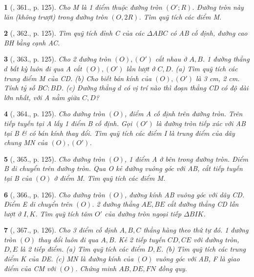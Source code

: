 \documentclass{article}
\newtheorem{baitoan}{}
\begin{document}
\begin{baitoan}[\cite{Binh_Toan_9_tap_2}, 361., p. 125]
	Cho M là 1 điểm thuộc đường tròn $(O';R)$. Đường tròn này lăn (không trượt) trong đường tròn $(O,2R)$. Tìm quỹ tích các điểm M.
\end{baitoan}

\begin{baitoan}[\cite{Binh_Toan_9_tap_2}, 362., p. 125]
	Tìm quỹ tích đỉnh C của các $\Delta ABC$ có AB cố định, đường cao BH bằng cạnh AC.
\end{baitoan}

\begin{baitoan}[\cite{Binh_Toan_9_tap_2}, 363., p. 125]
	Cho 2 đường tròn $(O),(O')$ cắt nhau ở $A,B$. 1 đường thẳng $d$ bất kỳ luôn đi qua A cắt $(O),(O')$ lần lượt ở $C,D$. (a) Tìm quỹ tích các trung điểm M của CD. (b) Cho biết bán kính của $(O),(O')$ là {\rm3 cm, 2 cm}. Tính tỷ số $BC:BD$. (c) Đường thẳng $d$ có vị trí nào thì đoạn thẳng CD có độ dài lớn nhất, với A nằm giữa $C,D$?
\end{baitoan}

\begin{baitoan}[\cite{Binh_Toan_9_tap_2}, 364., p. 125]
	Cho đường tròn $(O)$, điểm A cố định trên đường tròn. Trên tiếp tuyến tại A lấy 1 điểm B cố định. Gọi $(O')$ là đường tròn tiếp xúc với AB tại B \& có bán kính thay đổi. Tìm quỹ tích các điểm I là trung điểm của dây chung MN của $(O),(O')$.
\end{baitoan}

\begin{baitoan}[\cite{Binh_Toan_9_tap_2}, 365., p. 125]
	Cho đường tròn $(O)$, 1 điểm A ở bên trong đường tròn. Điểm B di chuyển trên đường tròn. Qua O kẻ đường vuông góc với AB, cắt tiếp tuyến tại B của $(O)$ ở điểm M. Tìm quỹ tích các điểm M.
\end{baitoan}

\begin{baitoan}[\cite{Binh_Toan_9_tap_2}, 366., p. 126]
	Cho đường tròn $(O)$, đường kính AB vuông góc với dây CD. Điểm E di chuyển trên $(O)$. 2 đường thẳng $AE,BE$ cắt đường thẳng CD lần lượt ở $I,K$. Tìm quỹ tích tâm $O'$ của đường tròn ngoại tiếp $\Delta BIK$.
\end{baitoan}

\begin{baitoan}[\cite{Binh_Toan_9_tap_2}, 367., p. 126]
	Cho 3 điểm cố định $A,B,C$ thẳng hàng theo thứ tự đó. 1 đường tròn $(O)$ thay đổi luôn đi qua $A,B$. Kẻ 2 tiếp tuyến $CD,CE$ với đường tròn, $D,E$ là 2 tiếp điểm. (a) Tìm quỹ tích các điểm $D,E$. (b) Tìm quỹ tích các trung điểm K của DE. (c) MN là đường kính của $(O)$ vuông góc với AB, F là giao điểm của CM với $(O)$. Chứng minh $AB,DE,FN$ đồng quy.
\end{baitoan}
\end{document}
